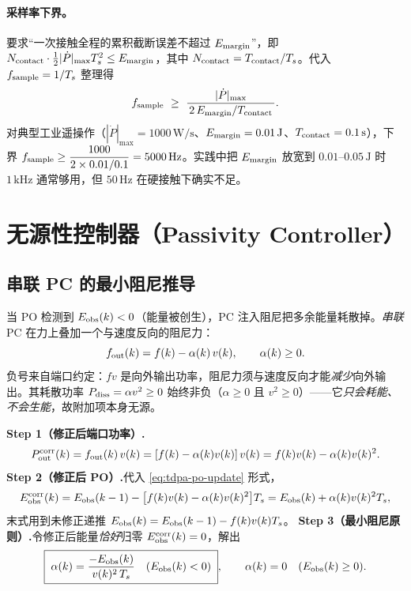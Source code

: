 \paragraph{采样率下界。}
要求“一次接触全程的累积截断误差不超过 $E_{\rm margin}$”，即 $N_{\rm contact}\cdot\tfrac12|\dot P|_{\max}T_s^2\le E_{\rm margin}$，其中 $N_{\rm contact}=T_{\rm contact}/T_s$。代入 $f_{\rm sample}=1/T_s$ 整理得
\begin{equation}
  f_{\rm sample}\ \ge\ \frac{|\dot P|_{\max}}{\,2\,E_{\rm margin}/T_{\rm contact}\,}.
  \label{eq:tdpa-fsample-bound}
\end{equation}
对典型工业遥操作（$|\dot P|_{\max}=1000\,\mathrm{W/s}$、$E_{\rm margin}=0.01\,\mathrm J$、$T_{\rm contact}=0.1\,\mathrm s$），下界 $f_{\rm sample}\ge\dfrac{1000}{2\times0.01/0.1}=5000\,\mathrm{Hz}$。实践中把 $E_{\rm margin}$ 放宽到 $0.01$–$0.05\,\mathrm J$ 时 $1\,\mathrm{kHz}$ 通常够用，但 $50\,\mathrm{Hz}$ 在硬接触下确实不足。

\section{无源性控制器（Passivity Controller）}
\label{sec:tdpa-pc}

\subsection{串联 PC 的最小阻尼推导}
\label{sec:tdpa-pc-series}

当 PO 检测到 $E_{\rm obs}(k)<0$（能量被创生），PC 注入阻尼把多余能量耗散掉。\emph{串联} PC 在力上叠加一个与速度反向的阻尼力：
\begin{equation}
  f_{\rm out}(k)=f(k)-\alpha(k)\,v(k),\qquad \alpha(k)\ge0 .
  \label{eq:tdpa-pc-series-law}
\end{equation}
负号来自端口约定：$fv$ 是向外输出功率，阻尼力须与速度反向才能\emph{减少}向外输出。其耗散功率 $P_{\rm diss}=\alpha v^2\ge0$ 始终非负（$\alpha\ge0$ 且 $v^2\ge0$）——它\emph{只会耗能、不会生能}，故附加项本身无源。

\begin{derivation}
\textbf{Step 1（修正后端口功率）.}\;
\[
  P_{\rm out}^{\rm corr}(k)=f_{\rm out}(k)\,v(k)=[f(k)-\alpha(k)v(k)]\,v(k)=f(k)v(k)-\alpha(k)v(k)^2 .
\]
\textbf{Step 2（修正后 PO）.}\;代入 \cref{eq:tdpa-po-update} 形式，
\[
  E_{\rm obs}^{\rm corr}(k)=E_{\rm obs}(k-1)-\big[f(k)v(k)-\alpha(k)v(k)^2\big]T_s
  =E_{\rm obs}(k)+\alpha(k)v(k)^2T_s,
\]
末式用到未修正递推 $E_{\rm obs}(k)=E_{\rm obs}(k-1)-f(k)v(k)T_s$。
\textbf{Step 3（最小阻尼原则）.}\;令修正后能量\emph{恰好}归零 $E_{\rm obs}^{\rm corr}(k)=0$，解出
\begin{equation}
  \boxed{\;\alpha(k)=\dfrac{-E_{\rm obs}(k)}{v(k)^2\,T_s}\quad(E_{\rm obs}(k)<0)\;},\qquad
  \alpha(k)=0\quad(E_{\rm obs}(k)\ge0).
  \label{eq:tdpa-alpha}
\end{equation}
\end{derivation}

